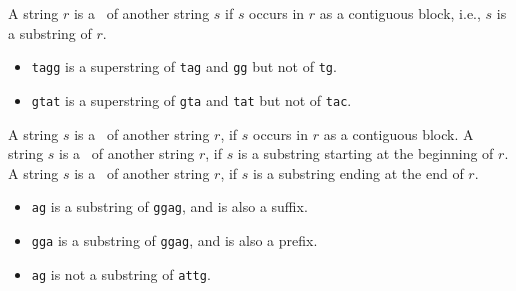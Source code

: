 \begin{flex}
\begin{definition}[Superstring]
A string $r$ is a~ of another string $s$ if $s$
occurs in $r$ as a contiguous block, i.e., $s$ is a substring of $r$.
\end{definition}

\begin{example}
\begin{itemize}
\item
\texttt{tagg} is a superstring of \texttt{tag} and \texttt{gg} but not
of \texttt{tg}.

\item
\texttt{gtat} is a superstring of \texttt{gta} and \texttt{tat} but not
of \texttt{tac}.
 
\end{itemize}

\end{example}

\end{flex}

\begin{flex}
\begin{definition}
A string $s$ is a~ of another string $r$, if $s$ occurs
in $r$ as a contiguous block.
%
A string $s$ is a~ of another string $r$, if $s$ is a substring
starting at the beginning of $r$.
% 
A string $s$ is a~ of another string $r$, if $s$ is a substring
ending at the end of $r$.
\end{definition}

\begin{example}
\begin{itemize}
\item
\texttt{ag} is a substring of \texttt{ggag}, and is also a suffix. 
\item
\texttt{gga} is a substring of \texttt{ggag}, and is also a prefix.
\item
\texttt{ag} is not a substring of \texttt{attg}.
\end{itemize}
\end{example}
\end{flex}

